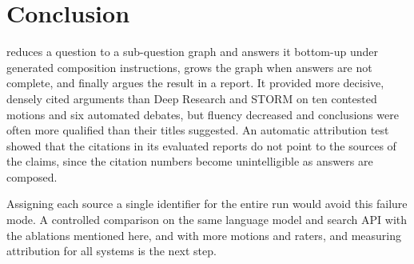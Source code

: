 \section{Conclusion}
\label{sec:conclusion}

\sys{} reduces a question to a sub-question graph and answers it bottom-up under generated composition instructions, grows the graph when answers are not complete, and finally argues the result in a report. It provided more decisive, densely cited arguments than Deep Research and STORM on ten contested motions and six automated debates, but fluency decreased and conclusions were often more qualified than their titles suggested. An automatic attribution test showed that the citations in its evaluated reports do not point to the sources of the claims, since the citation numbers become unintelligible as answers are composed.

Assigning each source a single identifier for the entire run would avoid this failure mode. A controlled comparison on the same language model and search API with the ablations mentioned here, and with more motions and raters, and measuring attribution for all systems is the next step.
